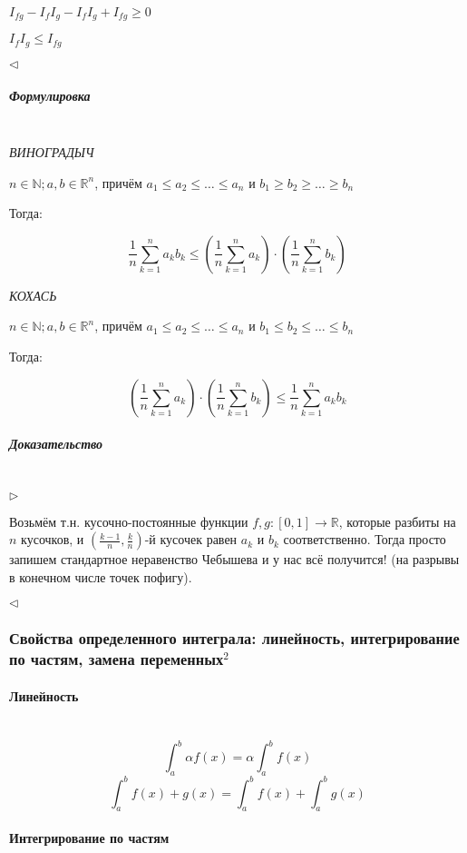 \documentclass{article}
\let\vanillaparagraph\paragraph
\let\vanillasubparagraph\subparagraph
\renewcommand{\paragraph}[1]{\vanillaparagraph{#1}\mbox{}\\}
\renewcommand{\subparagraph}[1]{\vanillasubparagraph{#1}\mbox{}\\}
\begin{document}
$I_{fg} - I_fI_g - I_fI_g + I_{fg} \ge 0$

$I_fI_g \le I_{fg}$

$\lhd$


\subparagraph{Формулировка}

\textit{ВИНОГРАДЫЧ}

$n \in \mathbb{N}; a, b \in \mathbb{R}^n$, причём $a_1 \le a_2 \le \ldots \le a_n$ и $b_1 \ge b_2 \ge \ldots \ge b_n$

Тогда:

\[\frac{1}{n}\sum_{k = 1}^n{a_kb_k} \le \left(\frac{1}{n}\sum_{k = 1}^n{a_k}\right) \cdot \left(\frac{1}{n}\sum_{k = 1}^n{b_k}\right)\]

\textit{КОХАСЬ}

$n \in \mathbb{N}; a, b \in \mathbb{R}^n$, причём $a_1 \le a_2 \le \ldots \le a_n$ и $b_1 \le b_2 \le \ldots \le b_n$

Тогда:

\[\left(\frac{1}{n}\sum_{k = 1}^n{a_k}\right) \cdot \left(\frac{1}{n}\sum_{k = 1}^n{b_k}\right) \le \frac{1}{n}\sum_{k = 1}^n{a_kb_k} \]


\subparagraph{Доказательство}

$\rhd$

Возьмём т.н. кусочно-постоянные функции $f, g: [0, 1] \rightarrow \mathbb{R}$, которые разбиты на $n$ кусочков, и $\left(\frac{k - 1}{n}, \frac{k}{n}\right)$-й кусочек равен $a_k$ и $b_k$ соответственно. Тогда просто запишем стандартное неравенство Чебышева и у нас всё получится! (на разрывы в конечном числе точек пофигу).

$\lhd$


\subsubsection{Свойства определенного интеграла: линейность, интегрирование по частям, замена переменных\texorpdfstring{$^2$}{}}

\paragraph{Линейность}

\[\int_a^b{\alpha f(x)} = \alpha \int_a^b{f(x)}\]
\[\int_a^b{f(x) + g(x)} = \int_a^b{f(x)} + \int_a^b{g(x)}\]


\paragraph{Интегрирование по частям}
\end{document}
